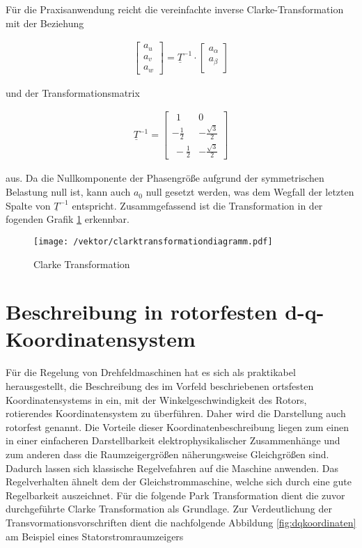 Für die Praxisanwendung reicht die vereinfachte inverse Clarke-Transformation mit der Beziehung

\begin{align}
	\begin{bmatrix}
		a_{u} \\
		a_{v} \\
		a_{w}
	\end{bmatrix}
	=\underline{T}^{-1}\cdot 
	\begin{bmatrix}
		a_{\alpha} \\
		a_{\beta} \\
	\end{bmatrix}
	\label{inverseclarkevektornulleinfach}
\end{align}
 
 und der Transformationsmatrix 
 
 \begin{align}
 	\underline{T}^{-1} =
 	\begin{bmatrix}
 		~~1 & 0   \\
 		-\frac{1}{2} & -\frac{\sqrt{3}}{2}  \\
 		~-\frac{1}{2} & -\frac{\sqrt{3}}{2} 
 	\end{bmatrix}
 	\label{inverseclarkematrixnulleinfach}
 \end{align}
 
 aus. 
 Da die Nullkomponente der Phasengröße aufgrund der symmetrischen Belastung null ist, kann auch $a_{0}$ null gesetzt werden, was dem Wegfall der letzten Spalte von ${\underline{T}^{-1}}$ entspricht. Zusammgefassend ist die Transformation in der fogenden Grafik \ref{fig:clarktransformationdiagramm} erkennbar.
 
 \begin{figure}[h]
 	\centering
 	\texttt{[image: /vektor/clarktransformationdiagramm.pdf]}
 	\label{fig:clarktransformationdiagramm}
 	\caption{Clarke Transformation}
 \end{figure}
 

\section{Beschreibung in rotorfesten d-q-Koordinatensystem}\label{sec:park}

Für die Regelung von Drehfeldmaschinen hat es sich als praktikabel herausgestellt, die Beschreibung des im Vorfeld beschriebenen ortsfesten Koordinatensystems in ein, mit der Winkelgeschwindigkeit des Rotors, rotierendes Koordinatensystem zu überführen. 
Daher wird die Darstellung auch rotorfest genannt. 
Die Vorteile dieser Koordinatenbeschreibung liegen zum einen in einer einfacheren Darstellbarkeit elektrophysikalischer Zusammenhänge und zum anderen dass die Raumzeigergrößen näherungsweise Gleichgrößen sind.
Dadurch lassen sich klassische Regelvefahren auf die Maschine anwenden.
Das Regelverhalten ähnelt dem der Gleichstrommaschine, welche sich durch eine gute Regelbarkeit auszeichnet. 
Für die folgende Park Transformation dient die zuvor durchgeführte Clarke Transformation als Grundlage. 
Zur Verdeutlichung der Transvormationsvorschriften dient die nachfolgende Abbildung \ref{fig:dqkoordinaten} am Beispiel eines Statorstromraumzeigers

